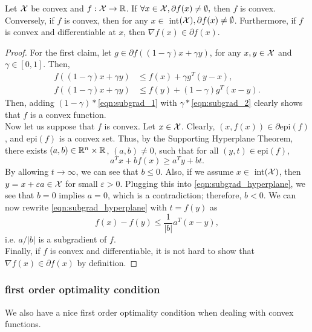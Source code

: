\begin{proposition}
Let $\mathcal{X}$ be convex and $f : \mathcal{X} \rightarrow \mathbb{R}$. If $\forall x \in \mathcal{X}, \partial f(x) \neq \emptyset,$ then $f$ is convex. Conversely, if $f$ is convex, then for any $x \in $ int$(\mathcal{X}), \partial f(x) \neq \emptyset$. Furthermore, if $f$ is convex and differentiable at $x$, then $\nabla f(x) \in \partial f(x)$. 
\begin{proof}
For the first claim, let $g \in \partial f( (1 - \gamma) x + \gamma y)$, for any $x,y \in \mathcal{X}$ and $\gamma \in [0,1]$. Then,
\begin{align}
f((1 - \gamma) x + \gamma y) &\leq f(x) + \gamma g^T (y - x), \label{eqn:subgrad_1} \\
f((1 - \gamma) x + \gamma y) &\leq f(y) + (1 - \gamma) g^T (x - y). \label{eqn:subgrad_2}
\end{align}
Then, adding $(1 - \gamma) *$\eqref{eqn:subgrad_1} with $\gamma *$\eqref{eqn:subgrad_2} clearly shows that $f$ is a convex function. \\

Now let us suppose that $f$ is convex. Let $x \in \mathcal{X}$. Clearly, $(x, f(x)) \in \partial\mbox{epi}(f)$, and $\mbox{epi}(f)$ is a convex set. Thus, by the Supporting Hyperplane Theorem, there exists $(a, b) \in \mathbb{R}^n \times \mathbb{R}$, $(a, b) \neq 0$, such that for all $(y, t) \in \mbox{epi} (f)$, 
\begin{equation} \label{eqn:subgrad_hyperplane}
a^T x + b f(x) \geq a^T y + bt.
\end{equation}
By allowing $t \rightarrow \infty$, we can see that $b \leq 0$. Also, if we assume $x \in $ int$(\mathcal{X})$, then $y = x + \varepsilon a \in \X$ for small $\varepsilon > 0$. Plugging this into \eqref{eqn:subgrad_hyperplane}, we see that $b = 0$ implies $a = 0$, which is a contradiction; therefore, $b < 0$. We can now rewrite \eqref{eqn:subgrad_hyperplane} with $t = f(y)$ as 
\[
f(x) - f(y) \leq \frac{1}{|b|} a^T (x - y),
\]
i.e. $a / |b|$ is a subgradient of $f$. \\

Finally, if $f$ is convex and differentiable, it is not hard to show that $\nabla f(x) \in \partial f(x)$ by definition. 
\end{proof}
\end{proposition}

\subsubsection{first order optimality condition}
We also have a nice first order optimality condition when dealing with convex functions.


